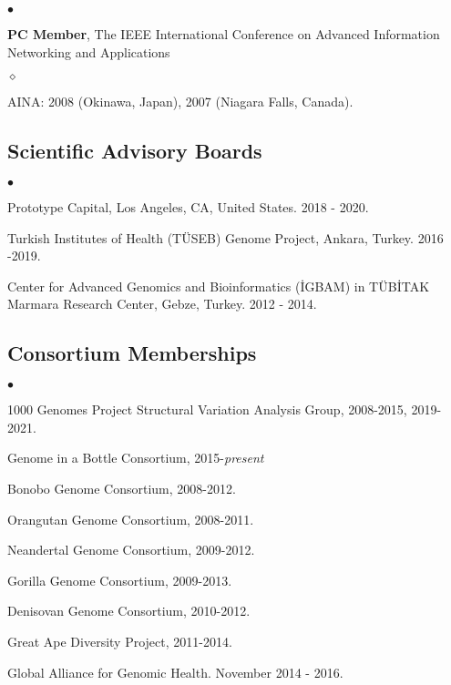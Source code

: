 \documentclass[margin,line]{res}
\newenvironment{list2}{
  \begin{list}{$\bullet$}{%
      \setlength{\itemsep}{0.1cm}
      \setlength{\parsep}{0in} \setlength{\parskip}{0in}
      \setlength{\topsep}{0in} \setlength{\partopsep}{0in} 
      \setlength{\leftmargin}{0.2in}}}{\end{list}}
\newenvironment{list3}{
  \begin{list}{$\diamond$}{%
      \setlength{\itemsep}{0in}
      \setlength{\parsep}{0.1cm} \setlength{\parskip}{0.1cm}
      \setlength{\topsep}{0.1cm} \setlength{\partopsep}{0.1cm} 
      \setlength{\leftmargin}{0.2in}}}{\end{list}}
\begin{document}
\begin{resume}
\begin{list2}
    \item
        \textbf{PC Member}, The IEEE International Conference on Advanced Information Networking and Applications 
        \begin{list3}
            \item AINA: 2008 (Okinawa, Japan), 2007 (Niagara Falls, Canada).
        \end{list3}
    
\end{list2}

\vspace{-0.4cm}
\subsection{\small \sc Scientific Advisory Boards}
\begin{list2}
    \item
        Prototype Capital, Los Angeles, CA, United States. 2018 - 2020.
    \item
        Turkish Institutes of Health (TÜSEB) Genome Project, Ankara, Turkey. 2016 -2019.
    \item
        Center for Advanced Genomics and Bioinformatics (\.{I}GBAM) in T\"{U}B\.{I}TAK Marmara Research Center, Gebze, Turkey. 2012 - 2014.
\end{list2}

\vspace{-0.4cm}
\subsection{\small \sc Consortium Memberships}

\begin{list2}
    \item
        1000 Genomes Project Structural Variation Analysis Group, 2008-2015, 2019-2021.
    \item
        Genome in a Bottle Consortium, 2015-{\it present}
    \item
        Bonobo Genome Consortium, 2008-2012.
    \item
        Orangutan Genome Consortium, 2008-2011.
    \item
        Neandertal Genome Consortium, 2009-2012.
    \item
        Gorilla Genome Consortium, 2009-2013.
    \item
        Denisovan Genome Consortium, 2010-2012.
    \item
        Great Ape Diversity Project, 2011-2014.
    \item
        Global Alliance for Genomic Health. November 2014 - 2016.
\end{list2}



\end{resume}
\end{document}
